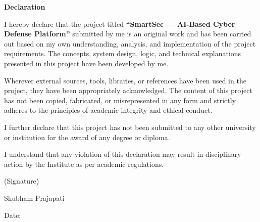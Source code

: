 \thispagestyle{empty}
\vspace{2cm}

\begin{center}
\textbf{\LARGE{Declaration}}
\end{center}

\vspace{1cm}

I hereby declare that the project titled \textbf{``SmartSec --- AI-Based Cyber Defense Platform''} submitted by me is an original work and has been carried out based on my own understanding, analysis, and implementation of the project requirements. The concepts, system design, logic, and technical explanations presented in this project have been developed by me.

Wherever external sources, tools, libraries, or references have been used in the project, they have been appropriately acknowledged. The content of this project has not been copied, fabricated, or misrepresented in any form and strictly adheres to the principles of academic integrity and ethical conduct.

I further declare that this project has not been submitted to any other university or institution for the award of any degree or diploma.

I understand that any violation of this declaration may result in disciplinary action by the Institute as per academic regulations.

\vspace{1in}

\begin{flushright}
(Signature)
\end{flushright}
\begin{flushright}
Shubham Prajapati \\
\end{flushright}

\vspace{0.3in}

\begin{flushleft}
Date:
\end{flushleft}
